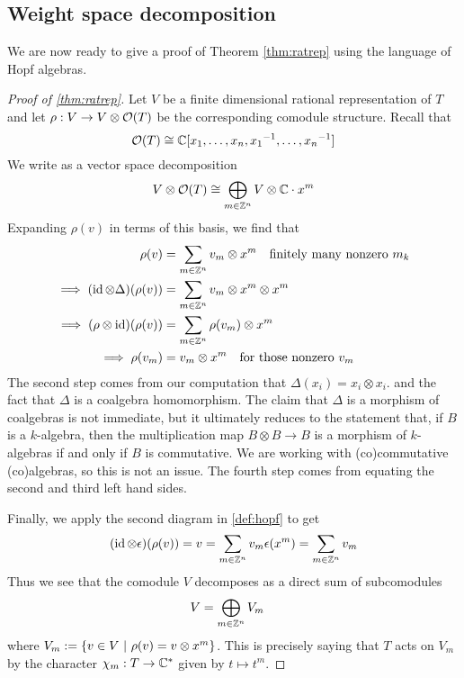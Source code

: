 \documentclass{amsart}
\numberwithin{equation}{section}
\theoremstyle{plain} %
\theoremstyle{definition}
\theoremstyle{remark}
\begin{document}
\subsection{Weight space decomposition}
We are now ready to give a proof of Theorem \ref{thm:ratrep} using the language of Hopf algebras.
\begin{proof}
	[Proof of \ref{thm:ratrep}] Let $V$ be a finite dimensional rational representation of $T$
	and let $\rho: V\to V\otimes \mathcal{O}(T)$ be the corresponding comodule structure. Recall that
	\[{\mathcal{O}}(T)\cong \mathbb{C}[x_1,\dots,x_n,{x_1}^{-1},\dots,{x_n}^{-1}]\] We write as a vector space
	decomposition \begin{align*}
		V \otimes \mathcal{O}(T) \cong \bigoplus_{m\in\mathbb{Z}^n} V\otimes \mathbb{C}\cdot x^m
	\end{align*} Expanding $\rho(v)$ in terms of this basis, we find that \begin{align*}
		\rho(v)                                & = \sum_{m\in\mathbb{Z}^n} v_m\otimes x^m \text{\quad finitely many nonzero $m_k$} \\
		\implies (\operatorname{id} \otimes \Delta)(\rho(v)) & = \sum_{m\in\mathbb{Z}^n} v_m\otimes x^m\otimes x^m                          \\
		\implies (\rho\otimes \operatorname{id})(\rho(v))    & = \sum_{m\in\mathbb{Z}^n} \rho(v_m)\otimes x^m                               \\
		\implies \rho(v_m)                     & = v_m\otimes x^m \text{\quad for those nonzero $v_m$}
	\end{align*} The second step comes from our computation that
	$\Delta(x_i) = x_i\otimes x_i$.
	and the fact that $\Delta$ is a coalgebra homomorphism. The claim that $\Delta$ is a
	morphism of coalgebras is not immediate, but it ultimately reduces to the statement that, if $B$ is
	a $k$-algebra, then the multiplication map $B\otimes B\to B$ is a morphism of $k$-algebras if and only if $B$ is commutative.
	We are working with (co)commutative (co)algebras, so this is not an issue. The fourth step comes from equating the second and third left hand sides.

	\hfill

	Finally, we apply the second diagram in \ref{def:hopf} to get \begin{align*}
		(\operatorname{id}\otimes \epsilon)(\rho(v)) = v = \sum_{m\in\mathbb{Z}^n} v_m\epsilon(x^m) = \sum_{m\in\mathbb{Z}^n} v_m
	\end{align*} Thus we see that the comodule $V$ decomposes as a direct sum of subcomodules \begin{align*}
		V & = \bigoplus_{m\in\mathbb{Z}^n} V_m
	\end{align*} where $V_m := \{v\in V \ \vert \  \rho(v) = v\otimes x^m\}$. This is precisely saying that $T$ acts on $V_m$ by the character $\chi_m: T\to \mathbb{C}^*$ given by $t\mapsto t^m$.
\end{proof}
\end{document}
